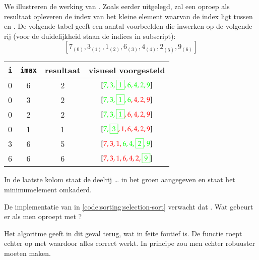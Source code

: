 \begin{example} \label{example:sorteer:selection:min}
We illustreren de werking van . Zoals eerder
uitgelegd, zal een oproep  als resultaat
opleveren de index van het kleine element waarvan de index ligt tussen 
en . De volgende tabel geeft een aantal voorbeelden die inwerken
op de volgende rij (voor de duidelijkheid staan de indices in subscript):
\[
  \newcommand{\IDX}[2]{#1_{\scriptscriptstyle(#2)}}
  [\IDX70, \IDX31, \IDX12, \IDX63, \IDX44, \IDX25, \IDX96]
\]
\begin{center}
  \newcommand{\NHL}[1]{{\color{red} #1}}
  \newcommand{\HL}[1]{{\color{green} #1}}
  \newcommand{\MIN}[1]{\framebox{#1}}
  \begin{tabular}{cccc}
    {\tt i} & {\tt imax} & resultaat & visueel voorgesteld \\ \hline
    0 & 6 & 2 & $[\HL{7,3,\MIN1,6,4,2,9}]$ \\
    0 & 3 & 2 & $[\NHL{\HL{7,3,\MIN1,6},4,2,9}]$ \\
    0 & 2 & 2 & $[\NHL{\HL{7,3,\MIN1},6,4,2,9}]$ \\
    0 & 1 & 1 & $[\NHL{\HL{7,\MIN3},1,6,4,2,9}]$ \\
    3 & 6 & 5 & $[\NHL{7,3,1,\HL{6,4,\MIN2,9}}]$ \\
    6 & 6 & 6 & $[\NHL{7,3,1,6,4,2,\HL{\MIN9}}]$ \\
  \end{tabular}
\end{center}
In de laatste kolom staat de deelrij \dots{} in het groen aangegeven
en staat het minimumelement omkaderd.
\end{example}

\begin{exercise}
De implementatie van 
in \cref{code:sorting:selection-sort} verwacht dat .
Wat gebeurt er als men  oproept met ?
\begin{solution}
Het algoritme geeft in dit geval  terug, wat in feite foutief is.
De functie  roept echter 
op met  waardoor alles correct werkt. In principe zou
men echter  robuuster moeten maken.
\end{solution}
\end{exercise}

